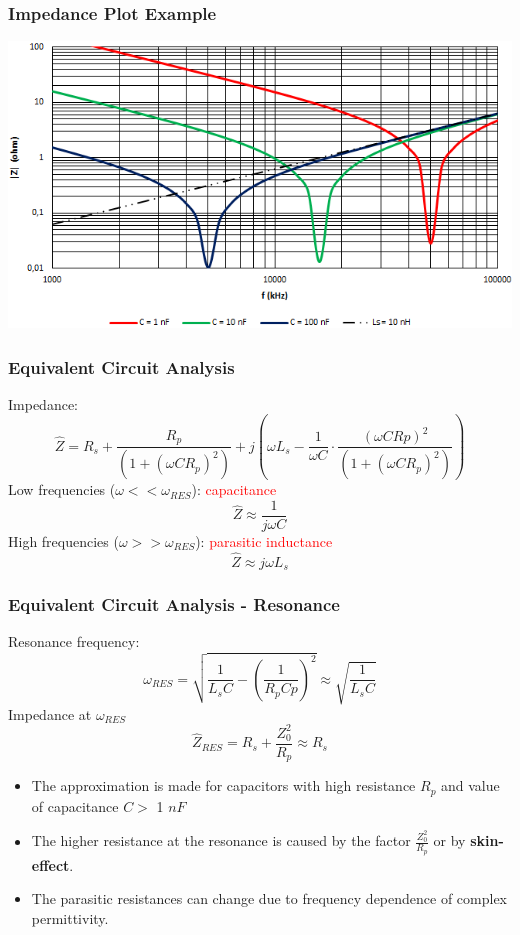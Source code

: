 \documentclass{beamer}
\begin{document}
	\begin{frame}
    \frametitle{Impedance Plot Example}

		\begin{center}
			\includegraphics[scale=0.62]{obr03_impedanceC.png}
		\end{center}
	\end{frame}
	\begin{frame}
    \frametitle{Equivalent Circuit Analysis}
		Impedance: 
		$$\hat{Z}= R_s+\frac{R_p}{\left(1+(\omega C R_p)^2\right)} + j\left(\omega L_s -\frac{1}{\omega C} \cdot \frac{(\omega C Rp)^2}{\left(1+(\omega C R_p)^2\right)}\right)$$
		Low frequencies ($\omega << \omega_{RES}$): \textcolor{red}{capacitance}
		$$\hat{Z}\approx \frac{1}{j\omega C}$$
		High frequencies ($\omega >> \omega_{RES}$): \textcolor{red}{parasitic inductance}
		$$\hat{Z}\approx j\omega L_s$$
	\end{frame}
	\begin{frame}
    \frametitle{Equivalent Circuit Analysis - Resonance}
		Resonance frequency:
		$$\omega_{RES}= \sqrt{\frac{1}{L_sC} - \left(\frac{1}{R_pCp}\right)^2}\approx \sqrt{\frac{1}{L_sC}}$$
		Impedance at $\omega_{RES}$
		$$\hat{Z}_{RES}=R_s + \frac{Z_0^2}{R_p}\approx R_s$$
		\small
		\begin{itemize}
			\item The approximation is made for capacitors with high resistance $R_p$ and value of capacitance $C>$ 1 $nF$
			\item The higher resistance at the resonance is caused by the factor $\frac{Z_0^2}{R_p}$ or by \textbf{skin-effect}. 
			\item The parasitic resistances can change due to frequency dependence of complex permittivity.
		\end{itemize}
	\end{frame}
\end{document}
